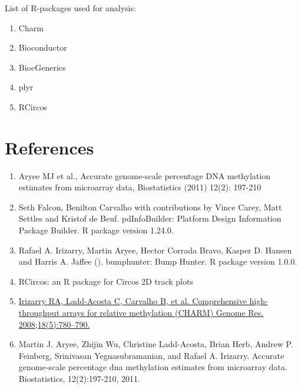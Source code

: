 \documentclass[11pt]{article}
\begin{document}
List of R-packages used for analysis:
\begin{enumerate}[itemsep=-0.2mm]

\item Charm

\item Bioconductor

\item BiocGenerics

\item plyr

\item RCircos


\end{enumerate}




\section*{References}  
\begin{enumerate}


	\item  Aryee MJ et al., Accurate genome-scale percentage DNA methylation estimates
	  from microarray data, Biostatistics (2011) 12(2): 197-210 	

	\item  Seth Falcon, Benilton Carvalho with contributions by Vince Carey, Matt
	  Settles and Kristof de Beuf. pdInfoBuilder: Platform Design Information
	  Package Builder. R package version 1.24.0.
	
	\item   Rafael A. Irizarry, Martin Aryee, Hector Corrada Bravo, Kasper D. Hansen and	Harris A. Jaffee (). bumphunter: Bump Hunter. R package version 1.0.0.
		
	\item RCircos: an R package for Circos 2D track plots
	


	\item \href{http://www.ncbi.nlm.nih.gov/pmc/articles/PMC2336799/}{Irizarry RA, Ladd-Acosta C, Carvalho B, et al. Comprehensive high-throughput arrays for relative methylation (CHARM) Genome Res. 2008;18(5):780–790.} 
	
	\item Martin J. Aryee, Zhijin Wu, Christine Ladd-Acosta, Brian Herb, Andrew P.
Feinberg, Srinivasan Yegnasubramanian, and Rafael A. Irizarry. Accurate
genome-scale percentage dna methylation estimates from microarray data.
Biostatistics, 12(2):197-210, 2011.

\end{enumerate}
\end{document}
